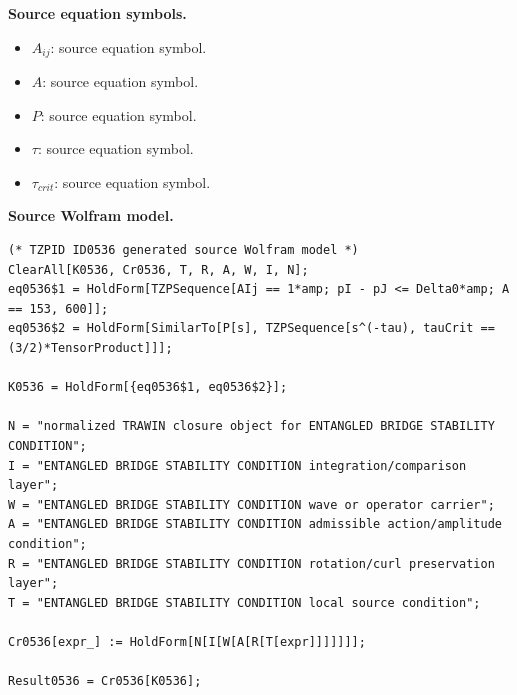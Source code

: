 \begin{minipage}[t]{0.49\linewidth}
\begingroup
\small
\raggedright
\textbf{Source equation symbols.}\par
\begin{itemize}[leftmargin=1.35em,itemsep=1pt,topsep=1pt,parsep=0pt]
    \item $A_{ij}$: source equation symbol.
    \item $A$: source equation symbol.
    \item $P$: source equation symbol.
    \item $\tau$: source equation symbol.
    \item $\tau_{crit}$: source equation symbol.
\end{itemize}
\endgroup
\end{minipage}\hfill
\begin{minipage}[t]{0.47\linewidth}
\begingroup
\scriptsize
\raggedright
\textbf{Source Wolfram model.}\par
\begin{Verbatim}[fontsize=\tiny,breaklines=true,breakanywhere=true]
(* TZPID ID0536 generated source Wolfram model *)
ClearAll[K0536, Cr0536, T, R, A, W, I, N];
eq0536$1 = HoldForm[TZPSequence[AIj == 1*amp; pI - pJ <= Delta0*amp; A == 153, 600]];
eq0536$2 = HoldForm[SimilarTo[P[s], TZPSequence[s^(-tau), tauCrit == (3/2)*TensorProduct]]];

K0536 = HoldForm[{eq0536$1, eq0536$2}];

N = "normalized TRAWIN closure object for ENTANGLED BRIDGE STABILITY CONDITION";
I = "ENTANGLED BRIDGE STABILITY CONDITION integration/comparison layer";
W = "ENTANGLED BRIDGE STABILITY CONDITION wave or operator carrier";
A = "ENTANGLED BRIDGE STABILITY CONDITION admissible action/amplitude condition";
R = "ENTANGLED BRIDGE STABILITY CONDITION rotation/curl preservation layer";
T = "ENTANGLED BRIDGE STABILITY CONDITION local source condition";

Cr0536[expr_] := HoldForm[N[I[W[A[R[T[expr]]]]]]];

Result0536 = Cr0536[K0536];
\end{Verbatim}
\endgroup
\end{minipage}

